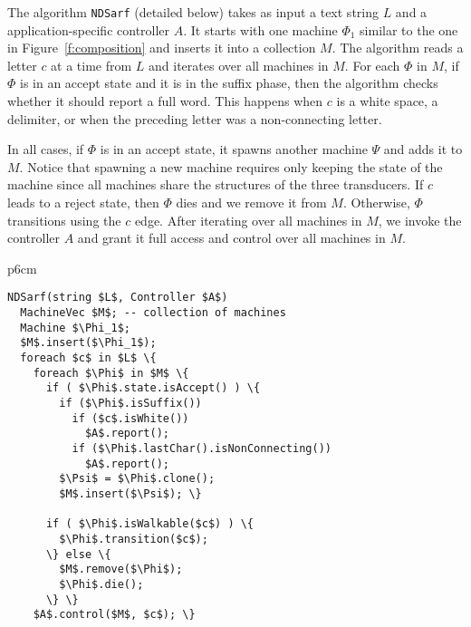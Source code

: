 \documentclass[11pt]{article}
\newcommand{\CodeIn}[1]{{\small\texttt{#1}}}
\begin{document}

\begin{figure}[tb]
\end{figure}

The algorithm \CodeIn{NDSarf} (detailed below)
takes as input a text string $L$ and a application-specific controller
$A$. 
It starts with one machine $\Phi_1$ similar to the one in 
Figure~\ref{f:composition} and inserts it into a collection
$M$. 
The algorithm reads a letter $c$ at a time from $L$
and iterates over all machines in $M$. 
For each $\Phi$ in $M$,
if $\Phi$ is in an accept state and it is in the suffix
phase, then the algorithm checks whether it should report
a full word. 
This happens when $c$ is a white space, a delimiter, 
or when the preceding letter %
was a non-connecting letter. 

In all cases, if $\Phi$ is in an accept state, 
it spawns another machine $\Psi$ and adds it to $M$. 
Notice that spawning a new machine requires only keeping
the state of the machine since all machines share the
structures of the three transducers.
If $c$ leads to a reject state, then $\Phi$ dies 
and we remove it from $M$. 
Otherwise, $\Phi$ transitions using the $c$ edge.
After iterating over all machines in $M$, we invoke the 
controller $A$
and grant it full access and control over
all machines in $M$. 


\begin{table}[tb]
\begin{tabular} {p{6cm}}
\begin{Verbatim}[fontsize=\relsize{-2},
frame=topline,framesep=4mm,label=\fbox{NDSarf algorithm},
commandchars=\\\{\}, codes={\catcode`$=3\catcode`_=8}]
NDSarf(string $L$, Controller $A$) 
  MachineVec $M$; -- collection of machines
  Machine $\Phi_1$;
  $M$.insert($\Phi_1$);
  foreach $c$ in $L$ \{
    foreach $\Phi$ in $M$ \{
      if ( $\Phi$.state.isAccept() ) \{
        if ($\Phi$.isSuffix())
          if ($c$.isWhite())  
            $A$.report();
          if ($\Phi$.lastChar().isNonConnecting())
            $A$.report();
        $\Psi$ = $\Phi$.clone();
        $M$.insert($\Psi$); \}

      if ( $\Phi$.isWalkable($c$) ) \{
        $\Phi$.transition($c$);
      \} else \{
        $M$.remove($\Phi$);
        $\Phi$.die();
      \} \} 
    $A$.control($M$, $c$); \}
\end{Verbatim}
\end{tabular}
\label{a:ndsarf}
\end{table}
\end{document}

